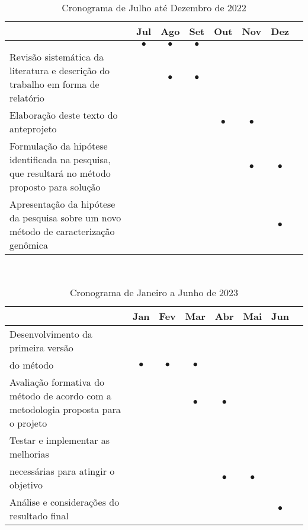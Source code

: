 \documentclass[font=plain]{abnt}
\begin{document}
\begin{table}[hb]
    \centering
    \begin{tabular}{ p{7.8cm} c c c c c c c }
        \toprule
         & Jul       & Ago       & Set       & Out       & Nov       & Dez       & \\
        \midrule
         & $\bullet$ & $\bullet$ & $\bullet$ &           &           &           & \\
        \midrule
        Revisão sistemática da literatura e descrição do trabalho em forma de relatório
         &           & $\bullet$ & $\bullet$ &           &           &           & \\
        \midrule
        Elaboração deste texto do anteprojeto
         &           &           &           & $\bullet$ & $\bullet$ &           & \\
        \midrule
        Formulação da hipótese identificada na pesquisa, que resultará no método proposto para solução
         &           &           &           &           & $\bullet$ & $\bullet$ & \\
        \midrule
        Apresentação da hipótese da pesquisa sobre um novo método de caracterização genômica
         &           &           &           &           &           & $\bullet$ & \\

        \bottomrule
    \end{tabular}
    \caption{Cronograma de Julho até Dezembro de 2022}~\label{tab:cronograma_tcc_i}
\end{table}

\begin{table}[ht]
    \centering
    \begin{tabular}{ p{7.8cm} c c c c c c c }
        \toprule
         & Jan       & Fev       & Mar       & Abr       & Mai       & Jun       & \\
        \midrule
        Desenvolvimento da primeira versão\\ do método
         & $\bullet$ & $\bullet$ & $\bullet$ &           &           &           & \\
        \midrule
        Avaliação formativa do método de acordo com a metodologia proposta para o projeto
         &           &           & $\bullet$ & $\bullet$ &           &           & \\
        \midrule
        Testar e implementar as melhorias\\ necessárias para atingir o objetivo
         &           &           &           & $\bullet$ & $\bullet$ &           & \\
        \midrule
        Análise e considerações do resultado final
         &           &           &           &           &           & $\bullet$ & \\
        \midrule
        \bottomrule
    \end{tabular}
    \caption{Cronograma de Janeiro a Junho de 2023}~\label{tab:cronograma_tcc_ii}
\end{table}
\end{document}
